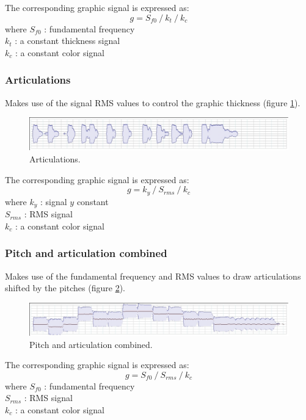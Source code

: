 \documentclass[11pt,letterpaper]{article}
\newcommand{\rshift}		{\hspace*{11mm}}
\begin{document}
The corresponding graphic signal is expressed as:
\[ g = S_{f0}\ /\ k_t\ /\ k_c \]
where $S_{f0}$ : fundamental frequency \\
\rshift	 $k_t$ : a constant thickness signal \\
\rshift	 $k_c$ : a constant color signal 
 
\subsubsection{Articulations}
Makes use of the signal RMS values to control the graphic thickness
(figure \ref{fig:articulation}).
\begin{figure}[htbp]
\centerline{
	\includegraphics[width=0.99\columnwidth]{rsrc/curves/articulation}}
\caption{Articulations.}
\label{fig:articulation}
\end{figure}
The corresponding graphic signal is expressed as:
\[ g = k_y\ /\ S_{rms}\ /\ k_c \]
where $k_y$ : signal $y$ constant \\
\rshift	 $S_{rms}$ : RMS signal \\
\rshift	 $k_c$ : a constant color signal 
 
\subsubsection{Pitch and articulation combined}
\label{pitchart}
Makes use of the fundamental frequency and RMS values to draw articulations shifted by the pitches
(figure \ref{fig:pitchedarticulation}).
\begin{figure}[htbp]
\centerline{
	\includegraphics[width=0.99\columnwidth]{rsrc/curves/pitchedarticulation}}
\caption{Pitch and articulation combined.}
\label{fig:pitchedarticulation}
\end{figure}

The corresponding graphic signal is expressed as:
\[ g = S_{f0}\ /\ S_{rms}\ /\ k_c \]
where $S_{f0}$ : fundamental frequency \\
\rshift	 $S_{rms}$ : RMS signal \\
\rshift	 $k_c$ : a constant color signal 
 
\end{document}
